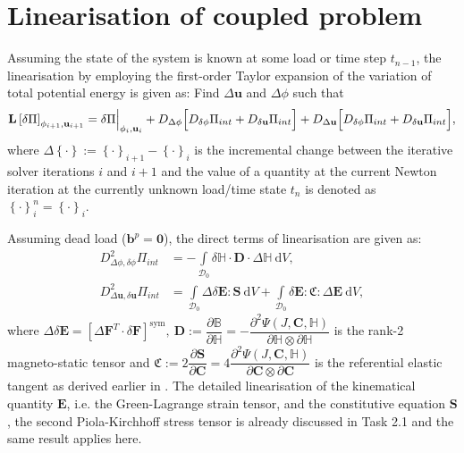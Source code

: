 \documentclass[11pt,a4paper,final]{article}
\begin{document}
\section{Linearisation of coupled problem}
Assuming the state of the system is known at some load or time step $t_{n-1}$, the linearisation by employing the first-order Taylor expansion of the variation of total potential energy is given as: Find $\Delta \mathbf{u}$ and $\Delta \phi$ such that
\begin{equation}
\mathbf{L} \left[ \delta \Pi \right]_{\phi_{i+1}, \mathbf{u}_{i+1}} = \delta \Pi \Big{|}_{\phi_i, \mathbf{u}_i} + D_{\Delta \phi} \Big[ D_{\delta \phi} \Pi_{int} + D_{\delta \mathbf{u}} \Pi_{int} \Big] + D_{\Delta \mathbf{u}} \Big[ D_{\delta \phi} \Pi_{int} + D_{\delta \mathbf{u}} \Pi_{int} \Big],
\label{eq:3.29}
\end{equation} 
where $\Delta \left\lbrace \cdot \right\rbrace := \left\lbrace \cdot \right\rbrace_{i+1} - \left\lbrace \cdot \right\rbrace_i$ is the incremental change between the iterative solver iterations $i$ and $i+1$ and the value of a quantity at the current Newton iteration at the currently unknown load/time state $t_n$ is denoted as $\left\lbrace \cdot \right\rbrace_i^n = \left\lbrace \cdot \right\rbrace_i$.

Assuming dead load ($\mathbf{b}^p = \mathbf{0}$), the direct terms of linearisation are given as:
\begin{align}
D^2_{\Delta \phi, \delta \phi} \Pi_{int} &= - \int\limits_{\mathcal{D}_0} \delta \mathbb{H} \cdot \mathbf{D} \cdot \Delta \mathbb{H} \ \mathrm{d}V, \label{eq:3.30.1}\\
D^2_{\Delta \mathbf{u}, \delta \mathbf{u}} \Pi_{int} &= \int\limits_{\mathcal{D}_0} \Delta \delta \mathbf{E} : \mathbf{S} \ \mathrm{d}V + \int\limits_{\mathcal{D}_0} \delta \mathbf{E} : \mathfrak{C} : \Delta \mathbf{E} \ \mathrm{d}V, \label{eq:3.30.2}
\end{align}
where $\Delta \delta \mathbf{E} = \left[ \Delta \mathbf{F}^T \cdot \delta \mathbf{F} \right]^{\text{sym}}, \ \mathbf{D} := \dfrac{\partial \mathbb{B}}{\partial \mathbb{H}} = -\dfrac{\partial^2 \Psi (J, \mathbf{C}, \mathbb{H})}{\partial \mathbb{H} \otimes \partial \mathbb{H}}$ is the rank-2 magneto-static tensor and $\mathfrak{C} := 2\dfrac{\partial \mathbf{S}}{\partial \mathbf{C}} = 4\dfrac{\partial^2 \Psi (J, \mathbf{C}, \mathbb{H})}{\partial \mathbf{C} \otimes \partial \mathbf{C}}$ is the referential elastic tangent as derived earlier in . The detailed linearisation of the kinematical quantity $\mathbf{E}$, i.e. the Green-Lagrange strain tensor, and the constitutive equation $\mathbf{S}$, the second Piola-Kirchhoff stress tensor is already discussed in Task 2.1 and the same result applies here. \par 
\end{document}

